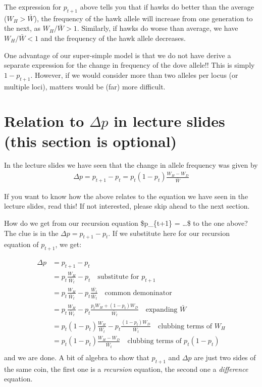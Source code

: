 \documentclass[
]{book}
\begin{document}
The expression for \(p_{t+1}\) above tells you that if hawks do better than the average (\(W_{H} > \bar{W}\)), the frequency of the hawk allele will increase from one generation to the next, as \(W_{H}/\bar{W} > 1\). Similarly, if hawks do worse than average, we have \(W_{H}/\bar{W} < 1\) and the frequency of the hawk allele decreases.

One advantage of our super-simple model is that we do not have derive a separate expression for the change in frequency of the dove allele!! This is simply \(1-p_{t+1}\). However, if we would consider more than two alleles per locus (or multiple loci), matters would be (far) more difficult.

\hypertarget{relation-to-delta-p-in-lecture-slides-this-section-is-optional}{%
\section{\texorpdfstring{Relation to \(\Delta p\) in lecture slides (this section is optional)}{Relation to \textbackslash Delta p in lecture slides (this section is optional)}}\label{relation-to-delta-p-in-lecture-slides-this-section-is-optional}}

In the lecture slides we have seen that the change in allele frequency was given by
\begin{align}
\Delta p = p_{t+1} - p_{t} = p_{t} \left ( 1 - p_{t} \right ) \frac{ W_{H} - W_{D}}{\bar{W}}
\end{align}

If you want to know how the above relates to the equation we have seen in the lecture slides, read this! If not interested, please skip ahead to the next section.

How do we get from our recursion equation \$p\_\{t+1\} = \ldots \$ to the one above?
The clue is in the \(\Delta p = p_{t+1} - p_{t}\). If we substitute here for our recursion equation of \(p_{t+1}\), we get:

\begin{align}
\Delta p &= p_{t+1} - p_{t} \\
&= p_{t}  \frac{W_{H}}{\bar{W}_{t}} - p_{t} \quad \text{substitute for }p_{t+1} \\
&= p_{t}  \frac{W_{H}}{\bar{W}_{t}} - p_{t} \frac{\bar{W_{t}}}{\bar{W}_{t}} \quad \text{common demoninator} \\
&= p_{t}  \frac{W_{H}}{\bar{W}_{t}} - p_{t} \frac{p_{t} W_{H} + \left (1  - p_{t}\right ) W_{D} }{\bar{W}_{t}} \quad \text{expanding }\bar{W} \\
&= p_{t} \left (1 - p_{t} \right )  \frac{W_{H}}{\bar{W}_{t}} - p_{t} \frac{\left (1  - p_{t}\right ) W_{D} }{\bar{W}_{t}} \quad \text{clubbing terms of }W_{H} \\
&= p_{t} \left (1 - p_{t} \right ) \frac{W_{H} - W_{D}}{\bar{W}_{t}} \quad \text{clubbing terms of }p_{t} \left(1-p_{t} \right) \\
\end{align}
and we are done. A bit of algebra to show that \(p_{t+1}\) and \(\Delta p\) are just two sides of the same coin, the first one is a \emph{recursion} equation, the second one a \emph{difference} equation.
\end{document}
